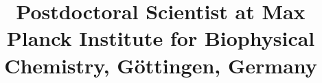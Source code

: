 \documentclass[12pt,a4paper,roman]{moderncv}
\title{Postdoctoral Scientist at Max Planck Institute for Biophysical Chemistry, G\"ottingen, Germany}
\begin{document}
\makecvtitle









%


\end{document}
